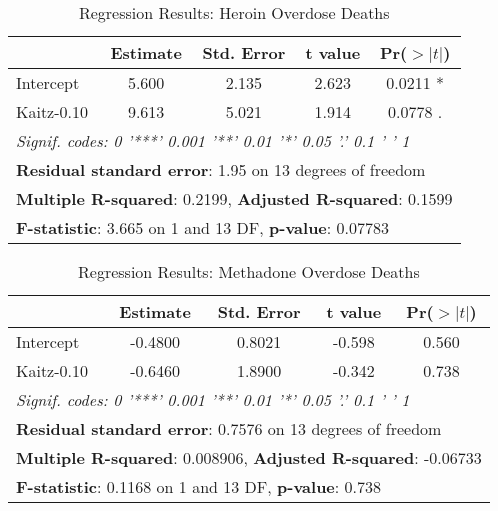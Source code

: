 \documentclass[12pt,a4paper]{article}
\begin{document}
\newpage

\begin{table}[ht]
    \centering
    \begin{tabular}{lcccc}
    \toprule
     & \textbf{Estimate} & \textbf{Std. Error} & \textbf{t value} & \textbf{Pr($>|t|$)} \\
    \midrule
    Intercept  & 5.600 & 2.135 & 2.623 & 0.0211 * \\
    Kaitz-0.10 & 9.613 & 5.021 & 1.914 & 0.0778 . \\
    \midrule
    \multicolumn{5}{l}{\textit{Signif. codes:  0 '***' 0.001 '**' 0.01 '*' 0.05 '.' 0.1 ' ' 1}} \\
    \midrule
    \multicolumn{5}{l}{\textbf{Residual standard error}: 1.95 on 13 degrees of freedom} \\
    \multicolumn{5}{l}{\textbf{Multiple R-squared}: 0.2199, \textbf{Adjusted R-squared}: 0.1599} \\
    \multicolumn{5}{l}{\textbf{F-statistic}: 3.665 on 1 and 13 DF, \textbf{p-value}: 0.07783} \\
    \bottomrule
    \end{tabular}
    \caption{Regression Results: Heroin Overdose Deaths}
    \label{tab:regression_results_heroin}
\end{table}

\begin{table}[ht]
    \centering
    \begin{tabular}{lcccc}
    \toprule
     & \textbf{Estimate} & \textbf{Std. Error} & \textbf{t value} & \textbf{Pr($>|t|$)} \\
    \midrule
    Intercept  & -0.4800 & 0.8021 & -0.598 & 0.560 \\
    Kaitz-0.10 & -0.6460 & 1.8900 & -0.342 & 0.738 \\
    \midrule
    \multicolumn{5}{l}{\textit{Signif. codes:  0 '***' 0.001 '**' 0.01 '*' 0.05 '.' 0.1 ' ' 1}} \\
    \midrule
    \multicolumn{5}{l}{\textbf{Residual standard error}: 0.7576 on 13 degrees of freedom} \\
    \multicolumn{5}{l}{\textbf{Multiple R-squared}: 0.008906, \textbf{Adjusted R-squared}: -0.06733} \\
    \multicolumn{5}{l}{\textbf{F-statistic}: 0.1168 on 1 and 13 DF, \textbf{p-value}: 0.738} \\
    \bottomrule
    \end{tabular}
    \caption{Regression Results: Methadone Overdose Deaths}
    \label{tab:regression_results_methadone}
\end{table}
\end{document}
